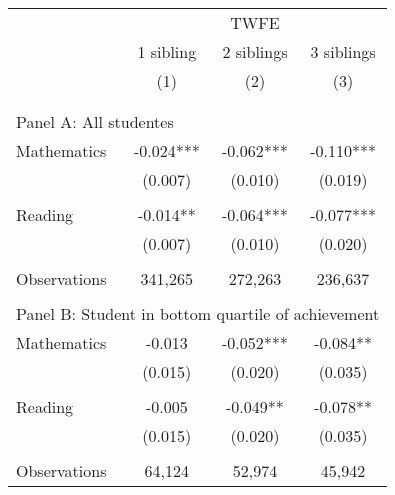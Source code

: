 \makeatletter
{}
{
\makeatother
\begin{tabular}{lccc}
\toprule
\cmidrule(lr){2-4}
& \multicolumn{3}{c}{TWFE} \\
\cmidrule(lr){2-4}
& 1 sibling & 2 siblings & 3 siblings  \\
\cmidrule(lr){2-2} \cmidrule(lr){3-3} \cmidrule(lr){4-4}
& (1) & (2) & (3)\\
\bottomrule
&  &  &  \\
&  &  &   \\
\multicolumn{4}{l}{Panel A: All studentes } \\
\hspace{3mm}Mathematics&      -0.024***&      -0.062***&      -0.110***\\
                    &     (0.007)   &     (0.010)   &     (0.019)   \\
 
&  &  &   \\
\hspace{3mm}Reading &      -0.014** &      -0.064***&      -0.077***\\
                    &     (0.007)   &     (0.010)   &     (0.020)   \\
                    &               &               &               \\
\hspace{3mm}Observations&     341,265   &     272,263   &     236,637   \\
 
&  &  &   \\
\multicolumn{4}{l}{Panel B: Student in bottom quartile of achievement} \\
\hspace{3mm}Mathematics&      -0.013   &      -0.052***&      -0.084** \\
                    &     (0.015)   &     (0.020)   &     (0.035)   \\
 
&  &  &   \\
\hspace{3mm}Reading &      -0.005   &      -0.049** &      -0.078** \\
                    &     (0.015)   &     (0.020)   &     (0.035)   \\
                    &               &               &               \\
\hspace{3mm}Observations&      64,124   &      52,974   &      45,942   \\
 

\end{tabular}}
